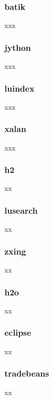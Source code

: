 \documentclass{article}
\begin{document}
\subsubsection{batik} xxx
    
\subsubsection{jython} xxx
    
\subsubsection{luindex} xxx
    
\subsubsection{xalan} xxx
    
\subsubsection{h2} xx
    
\subsubsection{lusearch} xx
    
\subsubsection{zxing} xx
    
\subsubsection{h2o} xx
    
\subsubsection{eclipse} xx
    
\subsubsection{tradebeans} xx
    
\end{document}
